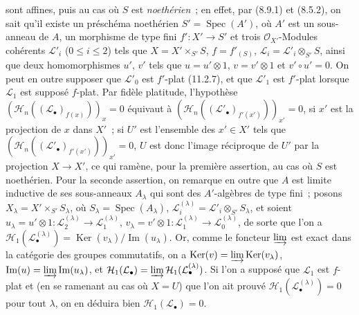 sont affines, puis au cas où $S$ est \emph{noethérien}~; en effet, par (8.9.1)
et (8.5.2), on sait qu'il existe un préschéma noethérien
$S'=\operatorname{Spec}(A')$, où $A'$ est un sous-anneau de $A$, un morphisme
de type fini $f':X'\to S'$ et trois $\mathcal O_{X'}$-Modules cohérents
$\mathcal L'_i$ ($0\leq i\leq2$) tels que $X=X'\times_{S'}S$,
$f=f'_{(S)}$, $\mathcal L_i=\mathcal L'_i\otimes_{S'}S$, ainsi que deux
homomorphismes $u'$, $v'$ tels que $u=u'\otimes1$, $v=v'\otimes1$ et
$v'\circ u'=0$. On peut en outre supposer que $\mathcal L'_0$ est $f'$-plat
(11.2.7), et que $\mathcal L'_1$ est $f'$-plat lorsque $\mathcal L_1$ est
supposé $f$-plat. Par fidèle platitude, l'hypothèse
$(\mathcal H_n((\mathcal L_\bullet)_{f(x)}))_x=0$ équivaut à
$(\mathcal H_n((\mathcal L'_\bullet)_{f'(x')}))_{x'}=0$, si $x'$ est la
projection de $x$ dans $X'$~; si $U'$ est l'ensemble des $x'\in X'$ tels que
$(\mathcal H_n((\mathcal L'_\bullet)_{f'(x')}))_{x'}=0$, $U$ est donc l'image
réciproque de $U'$ par la projection $X\to X'$, ce qui ramène, pour la première
assertion, au cas où $S$ est noethérien. Pour la seconde assertion, on remarque
en outre que $A$ est limite inductive de ses sous-anneaux $A_\lambda$ qui sont
des $A'$-algèbres de type fini~; posons
$X_\lambda=X'\times_{S'}S_\lambda$, où
$S_\lambda=\operatorname{Spec}(A_\lambda)$,
$\mathcal L_i^{(\lambda)}=\mathcal L'_i\otimes_{S'}S_\lambda$, et soient
$u_\lambda=u'\otimes1:\mathcal L_2^{(\lambda)}\to\mathcal L_1^{(\lambda)}$,
$v_\lambda=v'\otimes1:\mathcal L_1^{(\lambda)}\to\mathcal L_0^{(\lambda)}$,
de sorte que l'on a
$\mathcal H_1(\mathcal L_\bullet^{(\lambda)})
=\operatorname{Ker}(v_\lambda)/\operatorname{Im}(u_\lambda)$. Or, comme le
foncteur $\varinjlim$ est exact dans la catégorie des groupes commutatifs, on a
$\operatorname{Ker}(v)=\varinjlim\operatorname{Ker}(v_\lambda)$,
$\operatorname{Im}(u)=\varinjlim\operatorname{Im}(u_\lambda)$, et
$\mathcal H_1(\mathcal L_\bullet)
=\varinjlim\mathcal H_1(\mathcal L_\bullet^{(\lambda)})$. Si l'on a supposé
que $\mathcal L_1$ est $f$-plat et (en se ramenant au cas où $X=U$) que l'on
ait prouvé $\mathcal H_1(\mathcal L_\bullet^{(\lambda)})=0$ pour tout
$\lambda$, on en déduira bien $\mathcal H_1(\mathcal L_\bullet)=0$.

